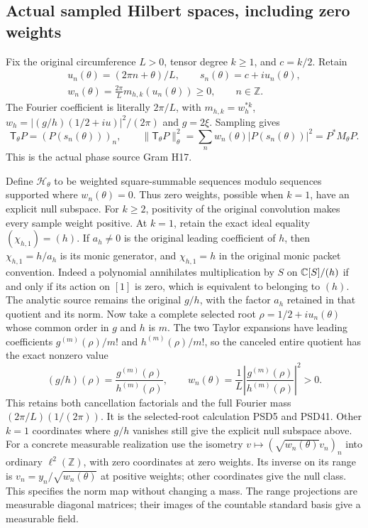 \subsection{Actual sampled Hilbert spaces, including zero weights}

Fix the original circumference $L>0$, tensor degree $k\ge1$,
and $c=k/2$. Retain
\[
 \begin{gathered}
 u_n(\theta)=(2\pi n+\theta)/L,\qquad
 s_n(\theta)=c+iu_n(\theta),\\
 w_n(\theta)=\frac{2\pi}{L}m_{h,k}(u_n(\theta))\ge0,
 \qquad n\in\mathbb Z.
 \end{gathered}
 \tag{HCD17}
\]
The Fourier coefficient is literally $2\pi/L$, with
$m_{h,k}=w_h^{*k}$, $w_h=|(g/h)(1/2+iu)|^2/(2\pi)$
and $g=2\xi$. Sampling gives
\[
 \mathsf T_\theta P=(P(s_n(\theta)))_n,\qquad
 \|\mathsf T_\theta P\|_\theta^2
 =\sum_n w_n(\theta)|P(s_n(\theta))|^2=P^*M_\theta P.
 \tag{HCD18}
\]
This is the actual phase source Gram H17.

Define $\mathcal H_\theta$ to be weighted square-summable
sequences modulo sequences supported where $w_n(\theta)=0$.
Thus zero weights, possible when $k=1$, have an explicit
null subspace. For $k\ge2$, positivity of the original
convolution makes every sample weight positive.
At $k=1$, retain the exact ideal equality
$(\chi_{h,1})=(h)$. If $a_h\ne0$ is the original leading
coefficient of $h$, then $\chi_{h,1}=h/a_h$ is its monic
generator, and $\chi_{h,1}=h$ in the original monic packet
convention. Indeed a polynomial annihilates multiplication by
$S$ on $\mathbb{C}[S]/(h)$ if and only if its action on $[1]$ is
zero, which is equivalent to belonging to $(h)$.
The analytic source remains the original $g/h$, with
the factor $a_h$ retained in that quotient and its norm.
Now take a complete selected root
$\rho=1/2+iu_n(\theta)$ whose common order in $g$ and $h$
is $m$. The two Taylor expansions have leading coefficients
$g^{(m)}(\rho)/m!$ and $h^{(m)}(\rho)/m!$, so the canceled
entire quotient has the exact nonzero value
\[
 (g/h)(\rho)=\frac{g^{(m)}(\rho)}{h^{(m)}(\rho)},\qquad
 w_n(\theta)=\frac1L
 \left|\frac{g^{(m)}(\rho)}{h^{(m)}(\rho)}\right|^2>0.
 \tag{HCD18a}
\]
This retains both cancellation factorials and the full
Fourier mass $(2\pi/L)(1/(2\pi))$. It is the selected-root
calculation PSD5 and PSD41. Other $k=1$ coordinates where
$g/h$ vanishes still give the explicit null subspace above.
For a concrete measurable realization use the isometry
$v\mapsto(\sqrt{w_n(\theta)}v_n)_n$ into ordinary
$\ell^2(\mathbb Z)$, with zero coordinates at zero weights.
Its inverse on its range is
$v_n=y_n/\sqrt{w_n(\theta)}$ at positive weights; other
coordinates give the null class. This specifies the norm
map without changing a mass. The range projections are
measurable diagonal matrices; their images of the countable
standard basis give a measurable field.

